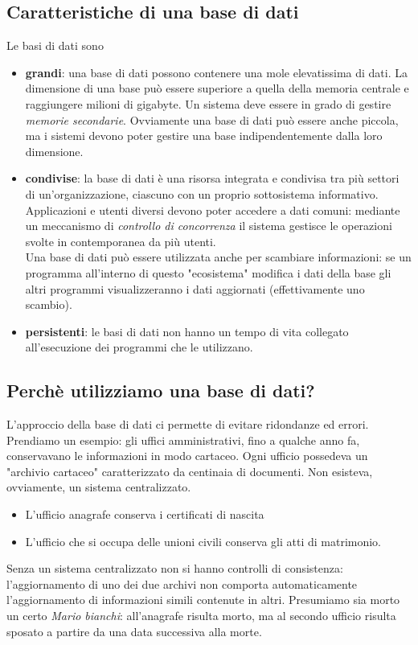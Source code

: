 \subsection{Caratteristiche di una base di dati}
Le basi di dati sono
\begin{itemize}
	\item \textbf{grandi}: una base di dati possono contenere una mole elevatissima di dati. La dimensione di una base può essere superiore a quella della memoria centrale e raggiungere milioni di gigabyte. Un sistema deve essere in grado di gestire \emph{memorie secondarie}. Ovviamente una base di dati può essere anche piccola, ma i sistemi devono poter gestire una base indipendentemente dalla loro dimensione.
	\item \textbf{condivise}: la base di dati è una risorsa integrata e condivisa tra più settori di un'organizzazione, ciascuno con un proprio sottosistema informativo. Applicazioni e utenti diversi devono poter accedere a dati comuni: mediante un meccanismo di \emph{controllo di concorrenza} il sistema gestisce le operazioni svolte in contemporanea da più utenti. \\Una base di dati può essere utilizzata anche per scambiare informazioni: se un programma all'interno di questo "ecosistema" modifica i dati della base gli altri programmi visualizzeranno i dati aggiornati (effettivamente uno scambio).
	\item \textbf{persistenti}: le basi di dati non hanno un tempo di vita collegato all'esecuzione dei programmi che le utilizzano.
\end{itemize}
\subsection{Perchè utilizziamo una base di dati?}
L'approccio della base di dati ci permette di evitare ridondanze ed errori. Prendiamo un esempio: gli uffici amministrativi, fino a qualche anno fa, conservavano le informazioni in modo cartaceo. Ogni ufficio possedeva un "archivio cartaceo" caratterizzato da centinaia di documenti. Non esisteva, ovviamente, un sistema centralizzato.
\begin{itemize}
	\item L'ufficio anagrafe conserva i certificati di nascita
	\item L'ufficio che si occupa delle unioni civili conserva gli atti di matrimonio.
\end{itemize}
Senza un sistema centralizzato non si hanno controlli di consistenza: l'aggiornamento di uno dei due archivi non comporta automaticamente l'aggiornamento di informazioni simili contenute in altri. Presumiamo sia morto un certo \emph{Mario bianchi}: all'anagrafe risulta morto, ma al secondo ufficio risulta sposato a partire da una data successiva alla morte.
